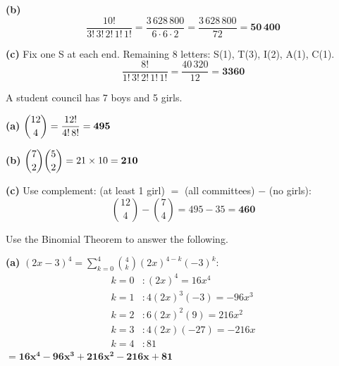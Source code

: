 \documentclass[addpoints]{exam}
\begin{document}
\begin{questions}
\begin{solution}[8cm]
\textbf{(b)}
\[
\frac{10!}{3!\,3!\,2!\,1!\,1!} = \frac{3\,628\,800}{6 \cdot 6 \cdot 2} = \frac{3\,628\,800}{72}
= \mathbf{50\,400}
\]

\textbf{(c)} Fix one S at each end. Remaining 8 letters: S(1), T(3), I(2), A(1), C(1).
\[
\frac{8!}{1!\,3!\,2!\,1!\,1!} = \frac{40\,320}{12} = \mathbf{3360}
\]
\end{solution}

\question A student council has 7 boys and 5 girls.
\begin{solution}[9cm]
\textbf{(a)} $\dbinom{12}{4} = \dfrac{12!}{4!\,8!} = \mathbf{495}$

\textbf{(b)} $\dbinom{7}{2}\dbinom{5}{2} = 21 \times 10 = \mathbf{210}$

\textbf{(c)} Use complement: (at least 1 girl) $=$ (all committees) $-$ (no girls):
\[
\binom{12}{4} - \binom{7}{4} = 495 - 35 = \mathbf{460}
\]
\end{solution}

\question Use the Binomial Theorem to answer the following.
\begin{solution}[9cm]
\textbf{(a)} $(2x-3)^4 = \sum_{k=0}^{4}\binom{4}{k}(2x)^{4-k}(-3)^k$:
\begin{align*}
k=0&: (2x)^4 = 16x^4\\
k=1&: 4(2x)^3(-3) = -96x^3\\
k=2&: 6(2x)^2(9) = 216x^2\\
k=3&: 4(2x)(−27) = -216x\\
k=4&: 81
\end{align*}
$= \mathbf{16x^4 - 96x^3 + 216x^2 - 216x + 81}$


\end{solution}
\end{questions}
\end{document}
